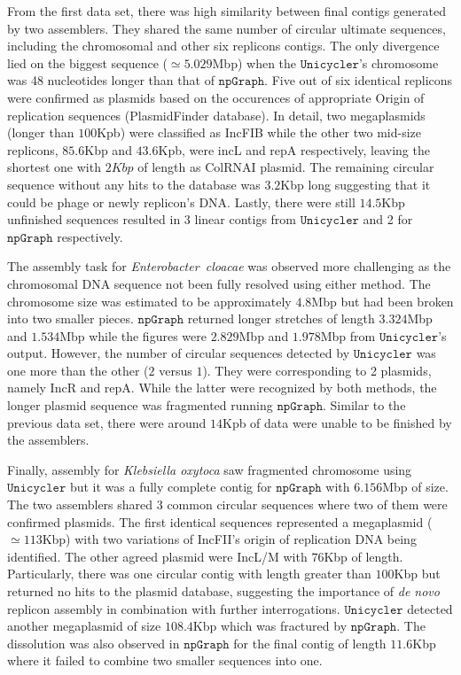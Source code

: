 \documentclass[10pt,twocolumn,twoside]{genpaper}
\newcommand{\npgraph}{$\mathtt{npGraph}$}
\newcommand{\unicycler}{$\mathtt{Unicycler}$}
\begin{document}
From the first data set, there was high similarity between final contigs generated by two assemblers.
They shared the same number of circular ultimate sequences, including the chromosomal and other six replicons contigs. 
The only divergence lied on the biggest sequence ($\simeq 5.029$Mbp) when the \unicycler{}'s chromosome was 48 nucleotides longer than that of \npgraph{}.
Five out of six identical replicons were confirmed as plasmids based on the occurences of appropriate Origin of replication sequences (PlasmidFinder database).
In detail, two megaplasmids (longer than $100$Kpb) were classified as IncFIB while the other two mid-size replicons, $85.6$Kbp and $43.6$Kpb, were incL and repA respectively, leaving the shortest one with $2Kbp$ of length as ColRNAI plasmid.
The remaining circular sequence without any hits to the database was $3.2$Kbp long suggesting that it could be phage or newly replicon's DNA.
Lastly, there were still $14.5$Kbp unfinished sequences resulted in 3 linear contigs from \unicycler{} and 2 for \npgraph{} respectively.

The assembly task for \emph{Enterobacter~cloacae} was observed more challenging as the chromosomal DNA sequence not been fully resolved using either method. 
The chromosome size was estimated to be approximately $4.8$Mbp but had been broken into two smaller pieces. 
\npgraph{} returned longer stretches of length $3.324$Mbp and $1.534$Mbp while the figures were $2.829$Mbp and $1.978$Mbp from \unicycler{}'s output.
However, the number of circular sequences detected by \unicycler{} was one more than the other ($2$ versus $1$). They were corresponding to 2 plasmids, namely IncR and repA.
While the latter were recognized by both methods, the longer plasmid sequence was fragmented running \npgraph{}.
Similar to the previous data set, there were around $14$Kpb of data were unable to be finished by the assemblers.

Finally, assembly for \emph{Klebsiella oxytoca} saw fragmented chromosome using \unicycler{} but it was a fully complete contig for \npgraph{} with $6.156$Mbp of size.
The two assemblers shared 3 common circular sequences where two of them were confirmed plasmids. 
The first identical sequences represented a megaplasmid ($\simeq 113$Kbp) with two variations of IncFII's origin of replication DNA being identified. 
The other agreed plasmid were IncL/M with $76$Kbp of length.
Particularly, there was one circular contig with length greater than $100$Kbp but returned no hits to the plasmid database, suggesting the importance of \emph{de novo} replicon assembly in combination with further interrogations.
\unicycler{} detected another megaplasmid of size $108.4$Kbp which was fractured by \npgraph{}. 
The dissolution was also observed in \npgraph{} for the final contig of length $11.6$Kbp where it failed to combine two smaller sequences into one.
\end{document}
